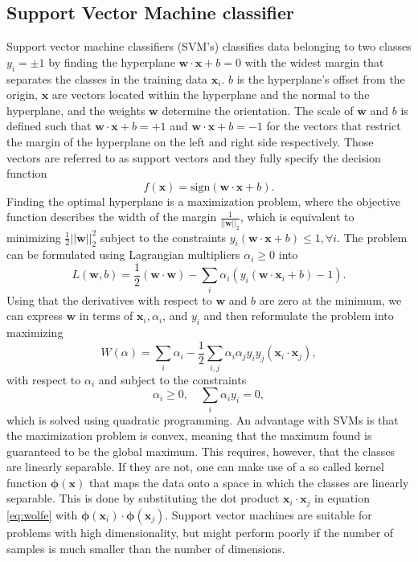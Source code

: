 \subsection{Support Vector Machine classifier}
Support vector machine classifiers (SVM's) classifies data belonging to two classes $y_i = \pm 1$ by finding the hyperplane $\boldsymbol{w} \cdot \boldsymbol{x} + b = 0$ with the widest margin that separates the classes in the training data $\boldsymbol{x}_i$. $b$ is the hyperplane's offset from the origin, $\boldsymbol{x}$ are vectors located within the hyperplane and the normal to the hyperplane, and the weights $\boldsymbol{w}$ determine the orientation. The scale of $\boldsymbol{w}$ and $b$ is defined such that $\boldsymbol{w} \cdot \boldsymbol{x} + b = +1$ and $\boldsymbol{w} \cdot \boldsymbol{x} + b = -1$ for the vectors that restrict the margin of the hyperplane on the left and right side respectively. Those vectors are referred to as support vectors and they fully specify the decision function
\[
f(\boldsymbol{x}) = \text{sign}(\boldsymbol{w}\cdot \boldsymbol{x} + b).
\]
Finding the optimal hyperplane is a maximization problem, where the objective function describes the width of the margin $\frac{1}{||\boldsymbol{w}||_2}$, which is equivalent to minimizing $\frac{1}{2}||\boldsymbol{w}||_2^2$ subject to the constraints $y_i (\boldsymbol{w}\cdot \boldsymbol{x} + b)\leq 1, \forall i$. The problem can be formulated using Lagrangian multipliers $\alpha_i \geq 0$ into
\[
L(\boldsymbol{w},b) = \frac{1}{2}(\boldsymbol{w} \cdot \boldsymbol{w}) - \sum_i \alpha_i (y_i (\boldsymbol{w} \cdot \boldsymbol{x}_i + b) - 1).
\]
Using that the derivatives with respect to $\boldsymbol{w}$ and $b$ are zero at the minimum, we can express $\boldsymbol{w}$ in terms of $\boldsymbol{x}_i, \alpha_i$, and $y_i$ and then reformulate the problem into maximizing
\begin{equation}
W(\alpha) = \sum_i \alpha_i - \frac{1}{2} \sum_{i,j} \alpha_i \alpha_j y_i y_j (\boldsymbol{x}_i \cdot \boldsymbol{x}_j),
\label{eq:wolfe}
\end{equation}
with respect to $\alpha_i$ and subject to the constraints
\[
\alpha_i \geq 0, \quad \sum_i \alpha_i y_i = 0,
\]
which is solved using quadratic programming. An advantage with SVMs is that the maximization problem is convex, meaning that the maximum found is guaranteed to be the global maximum. This requires, however, that the classes are linearly separable. If they are not, one can make use of a so called kernel function $\boldsymbol{\phi}(\boldsymbol{x})$ that maps the data onto a space in which the classes are linearly separable. This is done by substituting the dot product $\boldsymbol{x}_i \cdot \boldsymbol{x}_j$ in equation \eqref{eq:wolfe} with $\boldsymbol{\phi}(\boldsymbol{x}_i) \cdot \boldsymbol{\phi}(\boldsymbol{x}_j)$. Support vector machines are suitable for problems with high dimensionality, but might perform poorly if the number of samples is much smaller than the number of dimensions. \cite{Campbell11SVM}